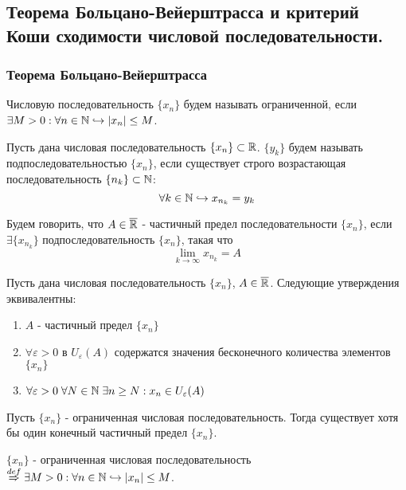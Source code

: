 \subsection{Теорема Больцано-Вейерштрасса и критерий Коши сходимости числовой последовательности.}

\subsubsection{Теорема Больцано-Вейерштрасса}

\Def Числовую последовательность $\{x_n\}$ будем называть ограниченной, если $\exists M > 0: \forall n \in \mathbb{N} \hookrightarrow |x_n| \leq M$.

\Def Пусть дана числовая последовательность $\{x_n\} \subset \mathbb{R}$. $\{y_k\}$ будем называть подпоследовательностью $\{x_n\}$, если существует строго возрастающая последовательность $\{n_k\} \subset \mathbb{N}$:
\begin{equation*}
    \forall k \in \mathbb{N} \hookrightarrow x_{n_k} = y_k
\end{equation*}

\Def Будем говорить, что $A \in \overline{\mathbb{R}}$ - частичный предел последовательности $\{x_n\}$, если $\exists \{x_{n_k}\}$ подпоследовательность $\{x_n\}$, такая что
\begin{equation*}
    \lim\limits_{k \to \infty} x_{n_k} = A
\end{equation*}

 Пусть дана числовая последовательность $\{x_n\}$, $A \in \overline{\mathbb{R}}$. Следующие утверждения эквивалентны:
\begin{enumerate}
    \item $A$ - частичный предел $\{x_n\}$
    \item $\forall \varepsilon > 0$ в $U_\varepsilon(A)$ содержатся значения бесконечного количества элементов $\{x_n\}$
    \item $\forall \varepsilon > 0 \; \forall N \in \mathbb{N} \; \exists n \geq N: x_n \in U_\varepsilon(A)$
\end{enumerate}

  Пусть $\{x_n\}$ - ограниченная числовая последовательность. Тогда существует хотя бы один конечный частичный предел $\{x_n\}$.

\Proof

$\{x_n\}$ - ограниченная числовая последовательность $\overset{def}{\Rightarrow} \exists M > 0: \forall n \in \mathbb{N} \hookrightarrow |x_n| \leq M$.

